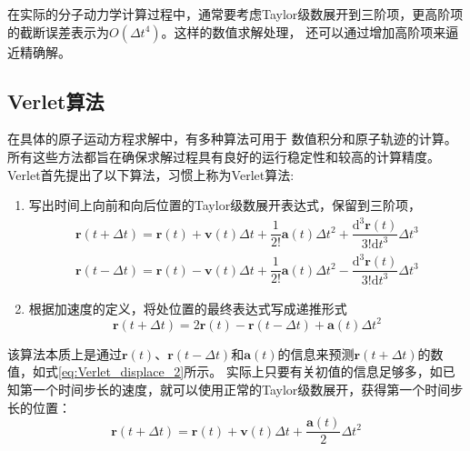 在实际的分子动力学计算过程中，通常要考虑\textrm{Taylor}级数展开到三阶项，更高阶项的截断误差表示为$O(\Delta t^4)$。这样的数值求解处理，%
还可以通过增加高阶项来逼近精确解。%
\subsection{\rm{Verlet}算法}
在具体的原子运动方程求解中，有多种算法可用于%
数值积分和原子轨迹的计算。所有这些方法都旨在确保求解过程具有良好的运行稳定性和较高的计算精度。\textrm{Verlet}\cite{PR159-98_1967}首先提出了以下算法，习惯上称为\textrm{Verlet}算法:~
\begin{enumerate}
	\item 写出时间上向前和向后位置的\textrm{Taylor}级数展开表达式，保留到三阶项，
		\begin{equation}
			\begin{aligned}
				\mathbf{r}(t+\Delta t)=\mathbf{r}(t)+\mathbf{v}(t)\Delta t+\dfrac1{2!}\mathbf{a}(t)\Delta t^2+\dfrac{\mathrm{d}^3\mathbf{r}(t)}{3!\mathrm{d}t^3}\Delta t^3\\
				\mathbf{r}(t-\Delta t)=\mathbf{r}(t)-\mathbf{v}(t)\Delta t+\dfrac1{2!}\mathbf{a}(t)\Delta t^2-\dfrac{\mathrm{d}^3\mathbf{r}(t)}{3!\mathrm{d}t^3}\Delta t^3
			\end{aligned}
			\label{eq:Verlet_displace}
		\end{equation}
	\item 根据加速度的定义，将处位置的最终表达式写成递推形式
		\begin{equation}
			\mathbf{r}(t+\Delta t)=2\mathbf{r}(t)-\mathbf{r}(t-\Delta t)+\mathbf{a}(t)\Delta t^2
			\label{eq:Verlet_displace_2}
		\end{equation}
\end{enumerate}
该算法本质上是通过$\mathbf{r}(t)$、$\mathbf{r}(t-\Delta t)$和$\mathbf{a}(t)$的信息来预测$\mathbf{r}(t+\Delta t)$的数值，如式\eqref{eq:Verlet_displace_2}所示。%
实际上只要有关初值的信息足够多，如已知第一个时间步长的速度，就可以使用正常的\textrm{Taylor}级数展开，获得第一个时间步长的位置：%
\begin{equation}
	\mathbf{r}(t+\Delta t)=\mathbf{r}(t)+\mathbf{v}(t)\Delta t+\dfrac{\mathbf{a}(t)}2\Delta t^2
	\label{eq:Verlet_Taylor}
\end{equation}
